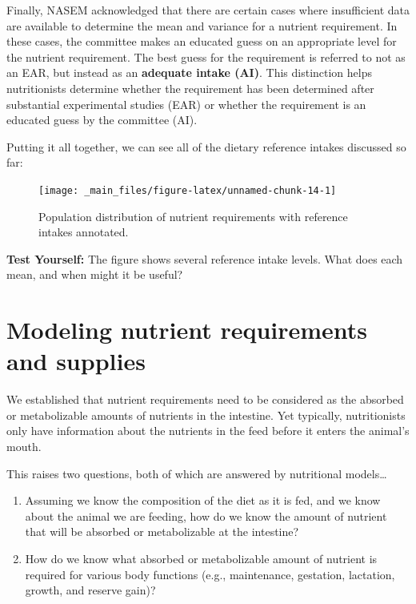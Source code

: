 \documentclass[
]{book}
\begin{document}
Finally, NASEM \citeyearpar{NASEM8} acknowledged that there are certain cases where insufficient data are available to determine the mean and variance for a nutrient requirement. In these cases, the committee makes an educated guess on an appropriate level for the nutrient requirement. The best guess for the requirement is referred to not as an EAR, but instead as an \textbf{adequate intake (AI)}. This distinction helps nutritionists determine whether the requirement has been determined after substantial experimental studies (EAR) or whether the requirement is an educated guess by the committee (AI).

Putting it all together, we can see all of the dietary reference intakes discussed so far:

\begin{figure}

{\centering \texttt{[image: \_main\_files/figure-latex/unnamed-chunk-14-1]} 

}

\caption{Population distribution of nutrient requirements with reference intakes annotated.}\label{fig:unnamed-chunk-14}
\end{figure}

\textbf{Test Yourself: }
The figure shows several reference intake levels. What does each mean, and when might it be useful?

\hypertarget{modeling-nutrient-requirements-and-supplies}{%
\section{Modeling nutrient requirements and supplies}\label{modeling-nutrient-requirements-and-supplies}}

We established that nutrient requirements need to be considered as the absorbed or metabolizable amounts of nutrients in the intestine. Yet typically, nutritionists only have information about the nutrients in the feed before it enters the animal's mouth.

This raises two questions, both of which are answered by nutritional models\ldots{}

\begin{enumerate}
\def\labelenumi{\arabic{enumi}.}
\item
  Assuming we know the composition of the diet as it is fed, and we know about the animal we are feeding, how do we know the amount of nutrient that will be absorbed or metabolizable at the intestine?
\item
  How do we know what absorbed or metabolizable amount of nutrient is required for various body functions (e.g., maintenance, gestation, lactation, growth, and reserve gain)?
\end{enumerate}
\end{document}
